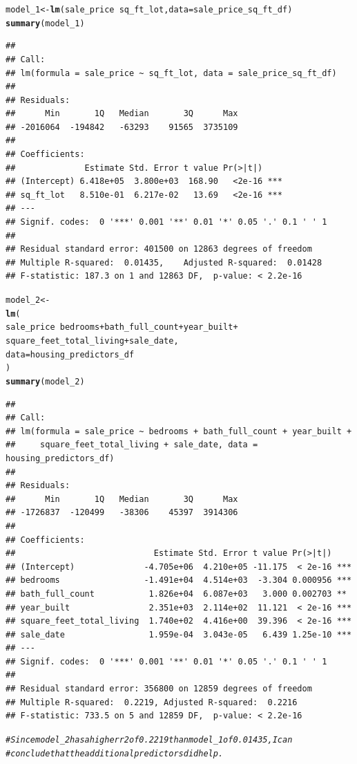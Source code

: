 \documentclass{article}\usepackage[]{graphicx}\usepackage[]{xcolor}
\makeatletter
\newcommand{\hlcom}[1]{\textcolor[rgb]{0.678,0.584,0.686}{\textit{#1}}}%
\newcommand{\hlopt}[1]{\textcolor[rgb]{0,0,0}{#1}}%
\newcommand{\hlstd}[1]{\textcolor[rgb]{0.345,0.345,0.345}{#1}}%
\newcommand{\hlkwb}[1]{\textcolor[rgb]{0.69,0.353,0.396}{#1}}%
\newcommand{\hlkwc}[1]{\textcolor[rgb]{0.333,0.667,0.333}{#1}}%
\newcommand{\hlkwd}[1]{\textcolor[rgb]{0.737,0.353,0.396}{\textbf{#1}}}%
\newenvironment{kframe}{%
 \def\at@end@of@kframe{}%
 \ifinner\ifhmode%
  \def\at@end@of@kframe{\end{minipage}}%
  \begin{minipage}{\columnwidth}%
 \fi\fi%
 \def\FrameCommand##1{\hskip\@totalleftmargin \hskip-\fboxsep
 \colorbox{shadecolor}{##1}\hskip-\fboxsep
     \hskip-\linewidth \hskip-\@totalleftmargin \hskip\columnwidth}%
 \MakeFramed {\advance\hsize-\width
   \@totalleftmargin\z@ \linewidth\hsize
   \@setminipage}}%
 {\par\unskip\endMakeFramed%
 \at@end@of@kframe}
\newenvironment{knitrout}{}{} %
\makeatother
\begin{document}
\begin{knitrout}
\begin{kframe}
\begin{alltt}
\hlstd{model_1} \hlkwb{<-} \hlkwd{lm}\hlstd{(sale_price} \hlopt{~} \hlstd{sq_ft_lot,} \hlkwc{data} \hlstd{= sale_price_sq_ft_df)}
\hlkwd{summary}\hlstd{(model_1)}
\end{alltt}
\begin{verbatim}
## 
## Call:
## lm(formula = sale_price ~ sq_ft_lot, data = sale_price_sq_ft_df)
## 
## Residuals:
##      Min       1Q   Median       3Q      Max 
## -2016064  -194842   -63293    91565  3735109 
## 
## Coefficients:
##              Estimate Std. Error t value Pr(>|t|)    
## (Intercept) 6.418e+05  3.800e+03  168.90   <2e-16 ***
## sq_ft_lot   8.510e-01  6.217e-02   13.69   <2e-16 ***
## ---
## Signif. codes:  0 '***' 0.001 '**' 0.01 '*' 0.05 '.' 0.1 ' ' 1
## 
## Residual standard error: 401500 on 12863 degrees of freedom
## Multiple R-squared:  0.01435,	Adjusted R-squared:  0.01428 
## F-statistic: 187.3 on 1 and 12863 DF,  p-value: < 2.2e-16
\end{verbatim}
\begin{alltt}
\hlstd{model_2} \hlkwb{<-}
  \hlkwd{lm}\hlstd{(}
    \hlstd{sale_price} \hlopt{~} \hlstd{bedrooms} \hlopt{+} \hlstd{bath_full_count} \hlopt{+} \hlstd{year_built} \hlopt{+}
    \hlstd{square_feet_total_living} \hlopt{+} \hlstd{sale_date,}
    \hlkwc{data} \hlstd{= housing_predictors_df}
  \hlstd{)}
\hlkwd{summary}\hlstd{(model_2)}
\end{alltt}
\begin{verbatim}
## 
## Call:
## lm(formula = sale_price ~ bedrooms + bath_full_count + year_built + 
##     square_feet_total_living + sale_date, data = housing_predictors_df)
## 
## Residuals:
##      Min       1Q   Median       3Q      Max 
## -1726837  -120499   -38306    45397  3914306 
## 
## Coefficients:
##                            Estimate Std. Error t value Pr(>|t|)    
## (Intercept)              -4.705e+06  4.210e+05 -11.175  < 2e-16 ***
## bedrooms                 -1.491e+04  4.514e+03  -3.304 0.000956 ***
## bath_full_count           1.826e+04  6.087e+03   3.000 0.002703 ** 
## year_built                2.351e+03  2.114e+02  11.121  < 2e-16 ***
## square_feet_total_living  1.740e+02  4.416e+00  39.396  < 2e-16 ***
## sale_date                 1.959e-04  3.043e-05   6.439 1.25e-10 ***
## ---
## Signif. codes:  0 '***' 0.001 '**' 0.01 '*' 0.05 '.' 0.1 ' ' 1
## 
## Residual standard error: 356800 on 12859 degrees of freedom
## Multiple R-squared:  0.2219,	Adjusted R-squared:  0.2216 
## F-statistic: 733.5 on 5 and 12859 DF,  p-value: < 2.2e-16
\end{verbatim}
\begin{alltt}
\hlcom{# Since model_2 has a higher r2 of 0.2219 than model_1 of 0.01435, I can}
\hlcom{# conclude that the additional predictors did help.}



\end{alltt}
\end{kframe}
\end{knitrout}
\end{document}
